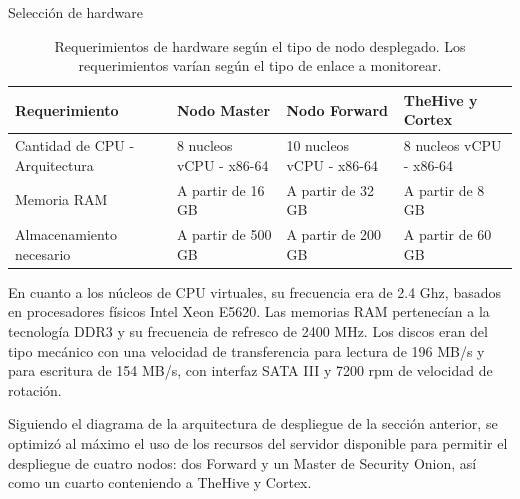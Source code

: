 \begin{section}{Selección de hardware}
        \begin{table}[H]
        \centering
        \begin{tabular}{|m{9em}|m{9em}|m{9em}|m{9em}|}
        
            \hline 
                Requerimiento  & Nodo Master &  Nodo Forward & TheHive y Cortex \\ 
            \hline
                Cantidad de CPU - Arquitectura & 8 nucleos vCPU - x86-64 & 10 nucleos vCPU - x86-64 & 8 nucleos vCPU - x86-64 \\ 
            \hline
                Memoria RAM  & A partir de 16 GB & A partir de 32 GB & A partir de 8 GB \\ 
            \hline
                Almacenamiento necesario & A partir de 500 GB  & A partir de 200 GB & A partir de 60 GB \\
            \hline %
        \end{tabular}
        \caption{Requerimientos de hardware según el tipo de nodo desplegado. Los requerimientos varían según el tipo de enlace a monitorear.}
        \label{table:12}
        \end{table}
        \FloatBarrier
        En cuanto a los núcleos de CPU virtuales, su frecuencia era de 2.4 Ghz, basados en procesadores físicos Intel Xeon E5620. Las memorias RAM pertenecían a la tecnología DDR3 y su frecuencia de refresco de 2400 MHz.
        Los discos eran del tipo mecánico con una velocidad de transferencia para lectura de 196 MB/s y para escritura de 154 MB/s, con interfaz SATA III y 7200 rpm de velocidad de rotación. \par
    	Siguiendo el diagrama de la arquitectura de despliegue de la sección anterior, se optimizó al máximo el uso de los recursos del servidor disponible para permitir el despliegue de cuatro nodos: dos Forward y un Master de Security Onion, así como un cuarto conteniendo a TheHive y Cortex. \par


\end{section}
